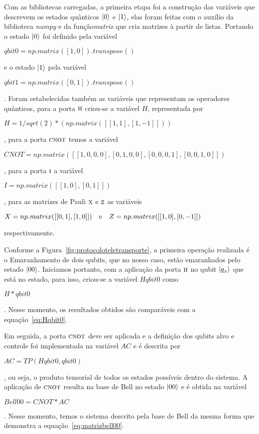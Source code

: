 Com as bibliotecas carregadas, a primeira etapa foi a construção das variáveis que descrevem os estados quânticos $\ket{0}$ e $\ket{1}$, elas foram feitas com o auxílio da biblioteca \textit{numpy} e da função\textit{matrix} que cria matrizes à partir de listas. Portando o estado $\ket{0}$ foi definido pela variável \begin{tiny}\textbf{$qbit0= np.matrix([1,0]).transpose()$}\end{tiny} e o estado $\ket{1}$ pela variável \begin{tiny}\textbf{$qbit1= np.matrix([0,1]).transpose()$}\end{tiny}.
Foram estabelecidas também as variáveis que representam os operadores quânticos, para a porta \(\operatorname{\textsc{h}}\) criou-se a variável \textit{$H$}, representada por \begin{tiny}\textbf{$H = 1/sqrt(2)*(np.matrix([[1,1], [1,-1]]))$}\end{tiny}, para a porta \(\operatorname{\textsc{cnot}}\) temos a variável \begin{tiny}\textbf{$CNOT = np.matrix([[1,0,0,0],[0,1,0,0],[0,0,0,1],[0,0,1,0]])$}\end{tiny}, para a porta \(\operatorname{\textsc{i}}\) a variável \begin{tiny}\textbf{$I = np.matrix ([[1,0], [0,1]])$}\end{tiny}, para as matrizes de Pauli \(\operatorname{\textsc{x}}\) e \(\operatorname{\textsc{z}}\) as variáveis \begin{tiny}\textbf{$X = np.matrix([[0, 1], [1, 0]]) \quad \text e \quad Z = np.matrix([[1, 0], [0, -1]])$}\end{tiny} respectivamente.

Conforme a Figura~\ref{fig:protocoloteletransporte}, a primeira operação realizada é o Emaranhamento de dois qubits, que no nosso caso, estão emaranhados pelo estado $\ket{00}$. Iniciamos portanto, com a aplicação da porta \(\operatorname{\textsc{h}}\) no qubit $\ket{q_x}$ que está no estado, para isso, criou-se a variável \textit{$Hqbit0$} como \begin{tiny}\textbf{$H*qbit0$}\end{tiny}. Nesse momento, os resultados obtidos são comparáveis com a equação~\eqref{eq:Hqbit0}. 

Em seguida, a porta \(\operatorname{\textsc{cnot}}\) deve ser aplicada e a definição dos qubits alvo e controle foi implementada na variável \textit{$AC$} e é descrita por \begin{tiny}\textbf{$AC= TP(Hqbit0,qbit0)$}\end{tiny}, ou seja, o produto tensorial de todos os estados possíveis dentro do sistema. A aplicação de \(\operatorname{\textsc{cnot}}\) resulta na base de Bell no estado $\ket{00}$ e é obtida na variável \begin{tiny}\textbf{$Bell00 = CNOT * AC$}\end{tiny}. Nesse momento, temos o sistema descrito pela base de Bell da mesma forma que demonstra a equação~\eqref{eq:matrizbell00}. 

